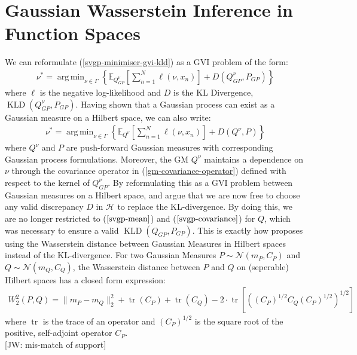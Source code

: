 \documentclass[twoside,11pt]{article}
\newcommand{\jw}[1]{{\color{gray} [JW: #1]}}
\newcommand{\KLD}{\operatorname{KLD}}
\newcommand{\tr}{\operatorname{tr}}
\DeclareMathOperator*{\argmin}{arg\,min}
\begin{document}
\section{Gaussian Wasserstein Inference in Function Spaces}
We can reformulate (\ref{svgp-minimiser-gvi-kld}) as a GVI problem of the form:
\begin{align}
    \label{svgp-gwi-gp}
    \nu^* = \argmin_{\nu \in \Gamma} \left\{ \mathbb{E}_{Q_{GP}^{\nu}}\left[\sum_{n=1}^N \ell(\nu, x_n)\right] + D(Q_{GP}^{\nu}, P_{GP})\right\}
\end{align}
where $\ell$ is the negative log-likelihood and $D$ is the KL Divergence, $\KLD(Q_{GP}^{\nu}, P_{GP})$. Having shown that a Gaussian process can exist as a Gaussian measure on a Hilbert space, we can also write:
\begin{align}
    \label{svgp-gwi-gm}
    \nu^* = \argmin_{\nu \in \Gamma} \left\{ \mathbb{E}_{Q^{\nu}}\left[\sum_{n=1}^N \ell(\nu, x_n)\right] + D(Q^{\nu}, P)\right\}
\end{align}
where $Q^{\nu}$ and $P$ are push-forward Gaussian measures with corresponding Gaussian process formulations. Moreover, the GM $Q^{\nu}$ maintains a dependence on $\nu$ through the covariance operator in (\ref{gm-covariance-operator}) defined with respect to the kernel of $Q_{GP}^{\nu}$. By reformulating this as a GVI problem between Gaussian measures on a Hilbert space, \cite{wild2022generalized} and \cite{knoblauch2022optimization} argue that we are now free to choose any valid discrepancy $D$ in $\mathcal{H}$ to replace the KL-divergence. By doing this, we are no longer restricted to ($\ref{svgp-mean}$) and ($\ref{svgp-covariance}$) for $Q$, which was necessary to ensure a valid $\KLD(Q_{GP},  P_{GP})$. This is exactly how \cite{wild2022generalized} proposes using the Wasserstein distance between Gaussian Measures in Hilbert spaces instead of the KL-divergence. For two Gaussian Measures $P \sim \mathcal{N}(m_P, C_P)$ and $Q \sim \mathcal{N}(m_Q, C_Q)$, the Wasserstein distance between $P$ and $Q$ on (seperable) Hilbert spaces has a closed form expression:
\begin{align}
    \label{wasserstein-distance}
    W_2^2(P, Q) = \| m_P - m_Q\|_2^2 + \tr(C_P) + \tr(C_Q) - 2 \cdot \tr \left[ \left( \left(C_P\right)^{1/2} C_Q \left(C_P\right)^{1/2}\right)^{1/2}\right]
\end{align}
where $\tr$ is the trace of an operator and $\left(C_P\right)^{1/2}$ is the square root of the positive, self-adjoint operator $C_P$. 
\\\jw{mis-match of support}
\end{document}
